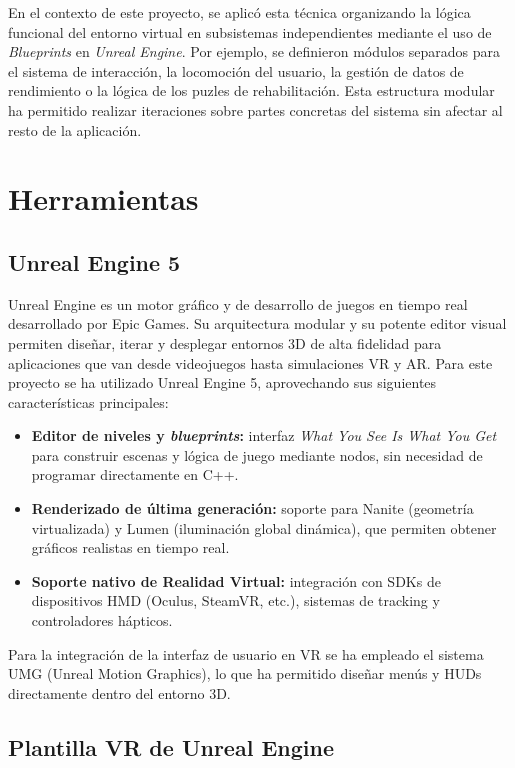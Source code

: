 En el contexto de este proyecto, se aplicó esta técnica organizando la lógica funcional del entorno virtual en subsistemas independientes mediante el uso de \textit{Blueprints} en \textit{Unreal Engine}. Por ejemplo, se definieron módulos separados para el sistema de interacción, la locomoción del usuario, la gestión de datos de rendimiento o la lógica de los puzles de rehabilitación. Esta estructura modular ha permitido realizar iteraciones sobre partes concretas del sistema sin afectar al resto de la aplicación.

\section{Herramientas}
\subsection{Unreal Engine 5}

Unreal Engine es un motor gráfico y de desarrollo de juegos en tiempo real desarrollado por Epic Games. Su arquitectura modular y su potente editor visual permiten diseñar, iterar y desplegar entornos 3D de alta fidelidad para aplicaciones que van desde videojuegos hasta simulaciones VR y AR. Para este proyecto se ha utilizado Unreal Engine 5, aprovechando sus siguientes características principales:

\begin{itemize}
  \item \textbf{Editor de niveles y \textit{blueprints}:} interfaz  \textit{What You See Is What You Get} para construir escenas y lógica de juego mediante nodos, sin necesidad de programar directamente en C++.
  \item \textbf{Renderizado de última generación:} soporte para Nanite (geometría virtualizada) y Lumen (iluminación global dinámica), que permiten obtener gráficos realistas en tiempo real.
  \item \textbf{Soporte nativo de Realidad Virtual:} integración con SDKs de dispositivos HMD (Oculus, SteamVR, etc.), sistemas de tracking y controladores hápticos.
\end{itemize}

Para la integración de la interfaz de usuario en VR se ha empleado el sistema UMG (Unreal Motion Graphics), lo que ha permitido diseñar menús y HUDs directamente dentro del entorno 3D.

\subsection{Plantilla VR de Unreal Engine}

